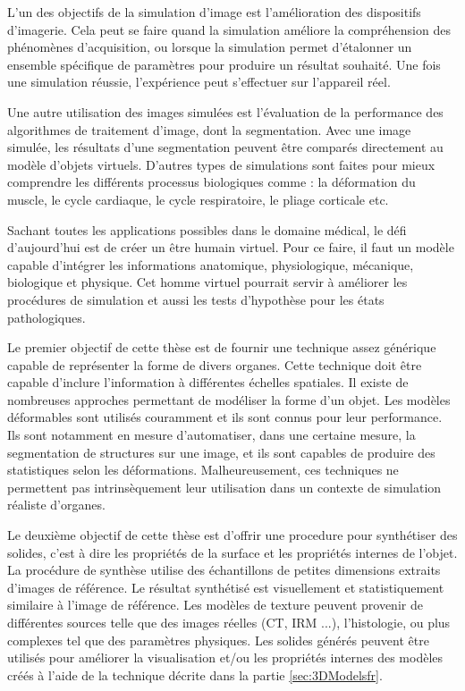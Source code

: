 L'un des objectifs de la simulation d'image est l'amélioration des dispositifs d'imagerie. 
Cela peut se faire quand la simulation améliore la compréhension des phénomènes d'acquisition, 
ou lorsque la simulation permet d'étalonner un ensemble spécifique de paramètres pour produire un résultat souhaité. 
Une fois une simulation réussie, l'expérience peut s'effectuer sur l'appareil réel.

Une autre utilisation des images simulées est l'évaluation de la performance des algorithmes de traitement d'image, 
dont la segmentation. Avec une image simulée, les résultats d'une segmentation peuvent être comparés directement au modèle d'objets virtuels. 
D'autres types de simulations sont faites pour mieux comprendre les différents processus biologiques comme : la déformation du muscle, le cycle cardiaque, le cycle respiratoire, le pliage corticale etc.

Sachant toutes les applications possibles dans le domaine médical, le défi d'aujourd'hui est de créer un être humain virtuel. 
Pour ce faire, il faut un modèle capable d'intégrer les informations anatomique, physiologique, mécanique, biologique et physique.
Cet homme virtuel pourrait servir à améliorer les procédures de simulation et aussi les tests d'hypothèse pour les états pathologiques.

Le premier objectif de cette thèse est de fournir une technique assez générique capable de 
représenter la forme de divers organes. Cette technique doit être capable d'inclure l'information à différentes échelles spatiales.
Il existe de nombreuses approches permettant de modéliser la forme d'un objet. 
Les modèles déformables sont utilisés couramment et ils sont connus pour leur performance.  
Ils sont notamment en mesure d'automatiser, dans une certaine mesure, 
la segmentation de structures sur une image, et ils sont capables de produire des statistiques 
selon les déformations. Malheureusement, ces techniques ne permettent pas intrinsèquement 
leur utilisation dans un contexte de simulation réaliste d'organes. 

Le deuxième objectif de cette thèse est d'offrir une procedure pour synthétiser des solides, c'est à dire les propriétés 
de la surface et les propriétés internes de l'objet. 
La procédure de synthèse utilise des échantillons de petites dimensions extraits d'images de référence.
Le résultat synthétisé est visuellement et statistiquement similaire à l'image de référence.
Les modèles de texture peuvent provenir de différentes sources telle que des images réelles (CT, IRM ...), 
l'histologie, ou plus complexes tel que des paramètres physiques.
Les solides générés peuvent être utilisés pour améliorer la visualisation et/ou les propriétés 
internes des modèles créés à l'aide de la technique décrite dans 
la partie \ref{sec:3DModelsfr}.

